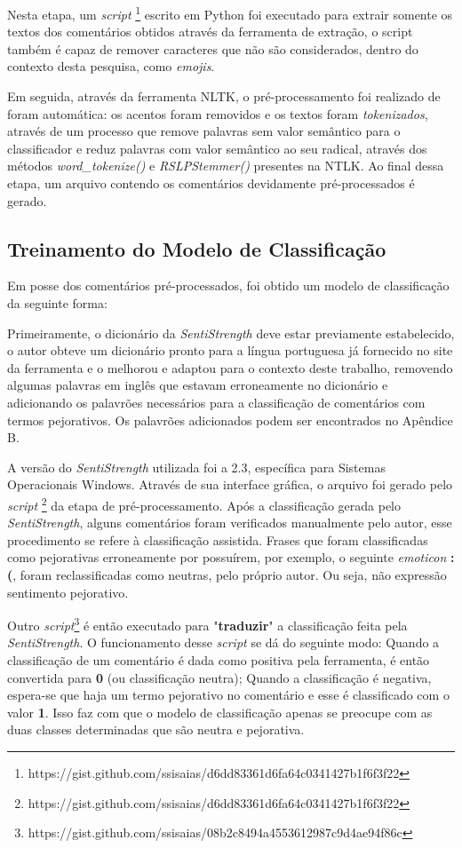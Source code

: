 Nesta etapa, um \textit{script} \footnote{https://gist.github.com/ssisaias/d6dd83361d6fa64c0341427b1f6f3f22} escrito em Python foi executado para extrair somente os textos dos comentários obtidos através da ferramenta de extração, o script também é capaz de remover caracteres que não são considerados, dentro do contexto desta pesquisa, como \textit{emojis}. 

Em seguida, através da ferramenta NLTK, o pré-processamento foi realizado de foram automática: os acentos foram removidos e os textos foram \textit{tokenizados}, através de um processo que remove palavras sem valor semântico para o classificador e reduz palavras com valor semântico ao seu radical, através dos métodos \textit{word\_tokenize()} e \textit{RSLPStemmer()} presentes na NTLK. Ao final dessa etapa, um arquivo contendo os comentários devidamente pré-processados é gerado. 

\subsection{Treinamento do Modelo de Classificação}
Em posse dos comentários pré-processados, foi obtido um modelo de classificação da seguinte forma:

Primeiramente, o dicionário da \textit{SentiStrength} deve estar previamente estabelecido, o autor obteve um dicionário pronto para a língua portuguesa já fornecido no site da ferramenta e o melhorou e adaptou para o contexto deste trabalho, removendo algumas palavras em inglês que estavam erroneamente no dicionário e adicionando os palavrões necessários para a classificação de comentários com termos pejorativos. Os palavrões adicionados podem ser encontrados no Apêndice B.

A versão do \textit{SentiStrength} utilizada foi a 2.3, específica para Sistemas Operacionais Windows. Através de sua interface gráfica, o arquivo foi gerado pelo \textit{script} \footnote{https://gist.github.com/ssisaias/d6dd83361d6fa64c0341427b1f6f3f22} da etapa de pré-processamento. Após a classificação gerada pelo \textit{SentiStrength}, alguns comentários foram verificados manualmente pelo autor, esse procedimento se refere à classificação assistida. Frases que foram classificadas como pejorativas erroneamente por possuírem, por exemplo, o seguinte \textit{emoticon} \textbf{:(}, foram reclassificadas como neutras, pelo próprio autor. Ou seja, não expressão sentimento pejorativo.

Outro \textit{script}\footnote{https://gist.github.com/ssisaias/08b2c8494a4553612987c9d4ae94f86c} é então executado para "\textbf{traduzir}" a classificação feita pela \textit{SentiStrength}. O funcionamento desse \textit{script} se dá do seguinte modo: Quando a classificação de um comentário é dada como positiva pela ferramenta, é então convertida para \textbf{0} (ou classificação neutra); Quando a classificação é negativa, espera-se que haja um termo pejorativo no comentário e esse é classificado com o valor \textbf{1}. Isso faz com que o modelo de classificação apenas se preocupe com as duas classes determinadas que são neutra e pejorativa.

